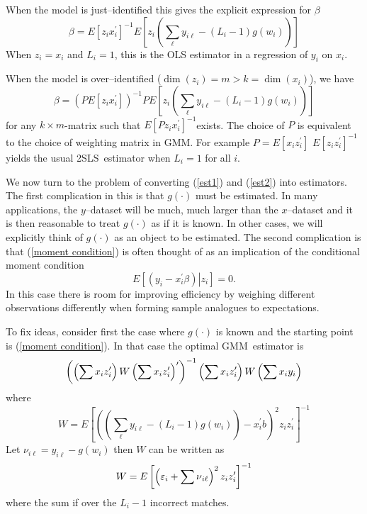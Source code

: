 \documentclass[12pt]{article}
\begin{document}
When the model is just--identified this gives the explicit expression for $%
\beta $%
\begin{equation}
\beta =E\left[ z_{i}x_{i}^{\prime }\right] ^{-1}E\left[ z_{i}\left(
\sum_{\ell }y_{i\ell }-\left( L_{i}-1\right) g\left( w_{i}\right) \right) %
\right]  \label{est1}
\end{equation}%
When $z_{i}=x_{i}$ and $L_{i}=1$, this is the OLS estimator in a regression
of $y_{i}$ on $x_{i}$.

When the model is over--identified ($\dim \left( z_{i}\right) =m>k=\dim
\left( x_{i}\right) $), we have%
\begin{equation}
\beta =\left( PE\left[ z_{i}x_{i}^{\prime }\right] \right) ^{-1}PE\left[
z_{i}\left( \sum_{\ell }y_{i\ell }-\left( L_{i}-1\right) g\left(
w_{i}\right) \right) \right]  \label{est2}
\end{equation}%
for any $k\times m$-matrix such that $E\left[ Pz_{i}x_{i}^{\prime }\right]
^{-1}$exists. The choice of $P$ is equivalent to the choice of weighting
matrix in GMM. For example $P=E\left[ x_{i}z_{i}^{\prime }\right] $ $E\left[
z_{i}z_{i}^{\prime }\right] ^{-1}$ yields the usual 2SLS\ estimator when $%
L_{i}=1$ for all $i$.

We now turn to the problem of converting (\ref{est1}) and (\ref{est2}) into
estimators. The first complication in this is that $g\left( \cdot \right) $
must be estimated. In many applications, the $y$--dataset will be much, much
larger than the $x$--dataset and it is then reasonable to treat $g\left(
\cdot \right) $ as if it is known. In other cases, we will explicitly think
of $g\left( \cdot \right) $ as an object to be estimated. The second
complication is that (\ref{moment condition}) is often thought of as an
implication of the conditional moment condition
\begin{equation}
E\left[ \left. \left( y_{i}-x_{i}^{\prime }\beta \right) \right\vert z_{i}%
\right] =0.  \label{cond moment}
\end{equation}%
In this case there is room for improving efficiency by weighing different
observations differently when forming sample analogues to expectations.

To fix ideas, consider first the case where $g\left( \cdot \right) $ is
known and the starting point is (\ref{moment condition}). In that case the
optimal GMM\ estimator is
\begin{equation*}
\left( \left( \mathop{\displaystyle \sum } x_{i}z_{i}^{\prime }\right) W\left( \mathop{\displaystyle \sum }
x_{i}z_{i}^{\prime }\right) ^{\prime }\right) ^{-1}\left( \mathop{\displaystyle \sum }
x_{i}z_{i}^{\prime }\right) W\left( \mathop{\displaystyle \sum } x_{i}y_{i}\right)
\end{equation*}%
where%
\begin{equation*}
W=E\left[ \left( \left( \sum_{\ell }y_{i\ell }-\left( L_{i}-1\right) g\left(
w_{i}\right) \right) -x_{i}^{\prime }b\right) ^{2}z_{i}z_{i}^{\prime }\right]
^{-1}
\end{equation*}%
Let $\nu _{i\ell }=y_{i\ell }-g\left( w_{i}\right) $ then $W$ can be written
as%
\begin{equation*}
W=E\left[ \left( \varepsilon _{i}+\dsum \nu _{i\ell }\right)
^{2}z_{i}z_{i}^{\prime }\right] ^{-1}
\end{equation*}%
where the sum if over the $L_{i}-1$ incorrect matches.
\end{document}
